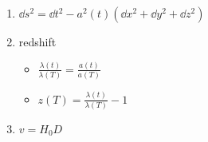 

\vspace*{\fill}
\centering

\begin{enumerate}
    \item $\dd{s^2} = \dd{t^2} - a^2(t)(\dd{x^2} + \dd{y^2} + \dd{z^2})$ 
    \item redshift
        \begin{itemize}
            \item $\displaystyle \frac{\lambda(t)}{\lambda(T)} = \frac{a(t)}{a(T)}$ 
            \item $\displaystyle z(T) = \frac{\lambda(t)}{\lambda(T)} - 1$
        \end{itemize}
    \item $v = H_0 D$
\end{enumerate}

\centering
\vspace*{\fill}

